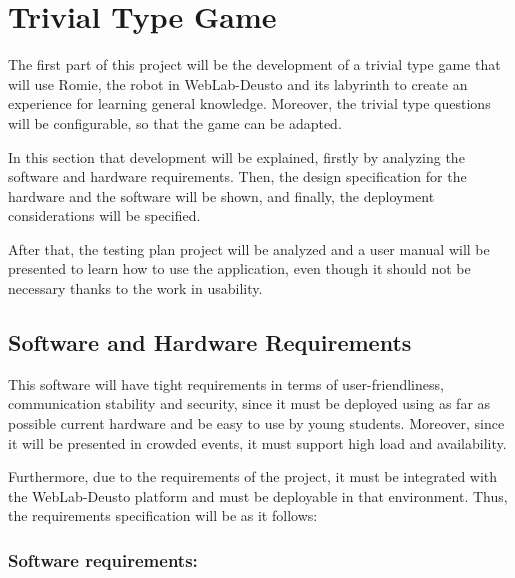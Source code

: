 \section{Trivial Type Game}

The first part of this project will be the development of a trivial type game that will use Romie,
the robot in WebLab-Deusto and its labyrinth to create an experience for learning general knowledge.
Moreover, the trivial type questions will be configurable, so that the game can be adapted.

In this section that development will be explained, firstly by analyzing the software and hardware
requirements. Then, the design specification for the hardware and the software will be shown, and
finally, the deployment considerations will be specified.

After that, the testing plan project will be analyzed and a user manual will be presented to learn
how to use the application, even though it should not be necessary thanks to the work in usability.

\subsection{Software and Hardware Requirements}

This software will have tight requirements in terms of user-friendliness, communication stability
and security, since it must be deployed using as far as possible current hardware and be easy to
use by young students. Moreover, since it will be presented in crowded events, it must support high
load and availability.

Furthermore, due to the requirements of the project, it must be integrated with the WebLab-Deusto
platform and must be deployable in that environment. Thus, the requirements specification will be
as it follows:

\subsubsection{Software requirements:}

